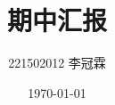 \documentclass{beamer}
\title{期中汇报}
\author{221502012 李冠霖}
\date{\today}
\begin{document}
\begin{frame}
    \maketitle
\end{frame}
\end{document}
